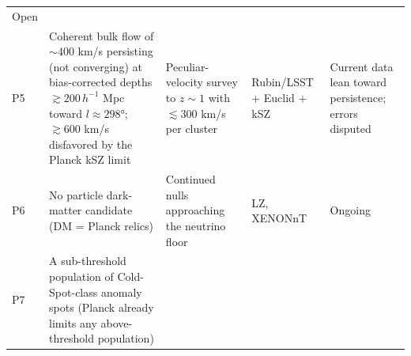 \documentclass[
]{article}
\begin{document}
\begin{longtable}[]{@{}lllll@{}}
\begin{minipage}[t]{0.19\columnwidth}
Open\strut
\end{minipage}\tabularnewline
\begin{minipage}[t]{0.11\columnwidth}\raggedright
P5\strut
\end{minipage} & \begin{minipage}[t]{0.19\columnwidth}\raggedright
Coherent bulk flow of \(\sim\!400\) km/s persisting (not converging) at
bias-corrected depths \(\gtrsim 200\,h^{-1}\) Mpc toward
\(l \approx 298°\); \(\gtrsim 600\) km/s disfavored by the Planck kSZ
limit\strut
\end{minipage} & \begin{minipage}[t]{0.19\columnwidth}\raggedright
Peculiar-velocity survey to \(z \sim 1\) with \(\lesssim 300\) km/s per
cluster\strut
\end{minipage} & \begin{minipage}[t]{0.19\columnwidth}\raggedright
Rubin/LSST + Euclid + kSZ\strut
\end{minipage} & \begin{minipage}[t]{0.19\columnwidth}\raggedright
Current data lean toward persistence; errors disputed\strut
\end{minipage}\tabularnewline
\begin{minipage}[t]{0.11\columnwidth}\raggedright
P6\strut
\end{minipage} & \begin{minipage}[t]{0.19\columnwidth}\raggedright
No particle dark-matter candidate (DM = Planck relics)\strut
\end{minipage} & \begin{minipage}[t]{0.19\columnwidth}\raggedright
Continued nulls approaching the neutrino floor\strut
\end{minipage} & \begin{minipage}[t]{0.19\columnwidth}\raggedright
LZ, XENONnT\strut
\end{minipage} & \begin{minipage}[t]{0.19\columnwidth}\raggedright
Ongoing\strut
\end{minipage}\tabularnewline
\begin{minipage}[t]{0.11\columnwidth}\raggedright
P7\strut
\end{minipage} & \begin{minipage}[t]{0.19\columnwidth}\raggedright
A sub-threshold population of Cold-Spot-class anomaly spots (Planck
already limits any above-threshold population)\strut
\end{minipage} & \begin{minipage}[t]{0.19\columnwidth}\raggedright

\end{minipage}
\end{longtable}
\end{document}
